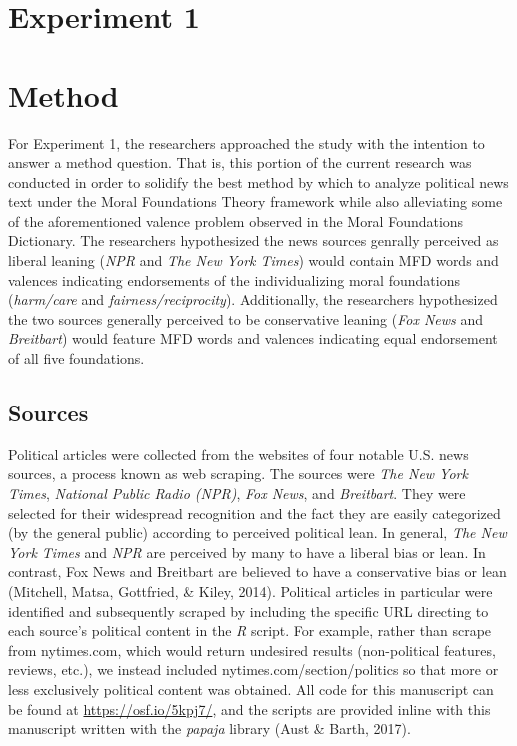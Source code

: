 \documentclass[,man]{apa6}
\begin{document}
\section{Experiment 1}\label{experiment-1}

\section{Method}\label{method}

For Experiment 1, the researchers approached the study with the
intention to answer a method question. That is, this portion of the
current research was conducted in order to solidify the best method by
which to analyze political news text under the Moral Foundations Theory
framework while also alleviating some of the aforementioned valence
problem observed in the Moral Foundations Dictionary. The researchers
hypothesized the news sources genrally perceived as liberal leaning
(\emph{NPR} and \emph{The New York Times}) would contain MFD words and
valences indicating endorsements of the individualizing moral
foundations (\emph{harm/care} and \emph{fairness/reciprocity}).
Additionally, the researchers hypothesized the two sources generally
perceived to be conservative leaning (\emph{Fox News} and
\emph{Breitbart}) would feature MFD words and valences indicating equal
endorsement of all five foundations.

\subsection{Sources}\label{sources}

Political articles were collected from the websites of four notable U.S.
news sources, a process known as web scraping. The sources were
\emph{The New York Times}, \emph{National Public Radio (NPR)}, \emph{Fox
News}, and \emph{Breitbart}. They were selected for their widespread
recognition and the fact they are easily categorized (by the general
public) according to perceived political lean. In general, \emph{The New
York Times} and \emph{NPR} are perceived by many to have a liberal bias
or lean. In contrast, Fox News and Breitbart are believed to have a
conservative bias or lean (Mitchell, Matsa, Gottfried, \& Kiley, 2014).
Political articles in particular were identified and subsequently
scraped by including the specific URL directing to each source's
political content in the \emph{R} script. For example, rather than
scrape from nytimes.com, which would return undesired results
(non-political features, reviews, etc.), we instead included
nytimes.com/section/politics so that more or less exclusively political
content was obtained. All code for this manuscript can be found at
\url{https://osf.io/5kpj7/}, and the scripts are provided inline with
this manuscript written with the \emph{papaja} library (Aust \& Barth,
2017).
\end{document}

